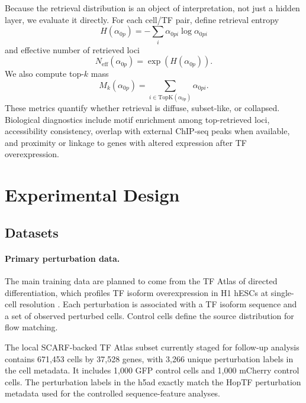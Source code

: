 \documentclass[11pt]{article}
\newcommand{\scarf}{\textsc{SCARF}}
\begin{document}
Because the retrieval distribution is an object of interpretation, not just a hidden layer, we evaluate it directly. For each cell/TF pair, define retrieval entropy
\begin{equation}
    H(\alpha_{0p}) = -\sum_i \alpha_{0pi}\log \alpha_{0pi}
\end{equation}
and effective number of retrieved loci
\begin{equation}
    N_{\mathrm{eff}}(\alpha_{0p}) = \exp(H(\alpha_{0p})).
\end{equation}
We also compute top-\(k\) mass
\begin{equation}
    M_k(\alpha_{0p}) = \sum_{i \in \mathrm{TopK}(\alpha_{0p})} \alpha_{0pi}.
\end{equation}
These metrics quantify whether retrieval is diffuse, subset-like, or collapsed. Biological diagnostics include motif enrichment among top-retrieved loci, accessibility consistency, overlap with external ChIP-seq peaks when available, and proximity or linkage to genes with altered expression after TF overexpression.

\section{Experimental Design}

\subsection{Datasets}

\paragraph{Primary perturbation data.}
The main training data are planned to come from the TF Atlas of directed differentiation, which profiles TF isoform overexpression in H1 hESCs at single-cell resolution \citep{joung2023}. Each perturbation is associated with a TF isoform sequence and a set of observed perturbed cells. Control cells define the source distribution for flow matching.

The local \scarf-backed TF Atlas subset currently staged for follow-up analysis contains 671,453 cells by 37,528 genes, with 3,266 unique perturbation labels in the cell metadata. It includes 1,000 GFP control cells and 1,000 mCherry control cells. The perturbation labels in the h5ad exactly match the HopTF perturbation metadata used for the controlled sequence-feature analyses.
\end{document}
